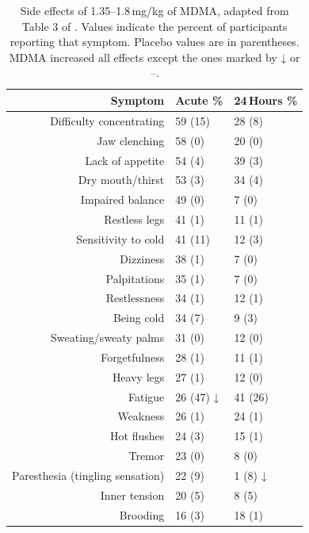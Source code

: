 \documentclass[11pt,oneside]{book}
\begin{document}
\begin{table}[htbp]
    \centering
    \caption{Side effects of 1.35--1.8\,mg/kg of MDMA, adapted from Table 3 of \textcite{liechtiGender}. Values indicate the percent of participants reporting that symptom. Placebo values are in parentheses. MDMA increased all effects except the ones marked by ↓ or --.}
    \label{table:sideeffects}
    \renewcommand{\arraystretch}{0.9}
    \begin{tabular}{|r|l|l|}
    \hline
    \textbf{Symptom} & \textbf{Acute \%} & \textbf{24\,Hours \%} \\ \hline
        Difficulty concentrating & 59 (15) & 28 (8)\\
        Jaw clenching            & 58 (0)  & 20 (0)\\
        Lack of appetite         & 54 (4)  & 39 (3)\\
        Dry mouth/thirst         & 53 (3)  & 34 (4)\\
        Impaired balance         & 49 (0)  & 7\phantom{0} (0)\\
        Restless legs            & 41 (1)  & 11 (1)\\
        Sensitivity to cold      & 41 (11) & 12 (3)\\
        Dizziness                & 38 (1)  & 7\phantom{0} (0)\\
        Palpitations             & 35 (1)  & 7\phantom{0} (0)\\
        Restlessness             & 34 (1)  & 12 (1)\\
        Being cold               & 34 (7)  & 9\phantom{0} (3)\\
        Sweating/sweaty palms    & 31 (0)  & 12 (0)\\
        Forgetfulness            & 28 (1)  & 11 (1)\\
        Heavy legs               & 27 (1)  & 12 (0)\\
        Fatigue                  & 26 (47) ↓ & 41 (26)\\
        Weakness                 & 26 (1)  & 24 (1)\\
        Hot flushes              & 24 (3)  & 15 (1)\\
        Tremor                   & 23 (0)  & 8\phantom{0} (0)\\
        Paresthesia (tingling sensation) & 22 (9) & 1\phantom{0} (8)\phantom{0} ↓\\
        Inner tension            & 20 (5)  & 8\phantom{0} (5)\\
        Brooding                 & 16 (3)  & 18 (1)\\

\end{tabular}
\end{table}
\end{document}
